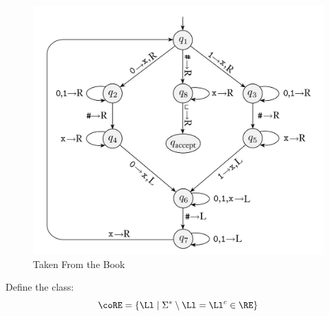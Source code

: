 \begin{example}
	\begin{figure}[H]
		\includegraphics[scale=.5]{TMex1.jpg}
		\caption{Taken From the Book}
	\end{figure}
	
\end{example}
\begin{yellowBox}
	
	\begin{defn}
		[$\coRE$] Define the class:\[
		\coRE = \{\Ll\mid \Sigma^*\setminus \Ll = \Ll^c\in \RE\}
		\]
	\end{defn}
\end{yellowBox}


